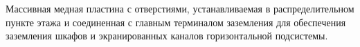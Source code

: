Массивная медная пластина с отверстиями, устанавливаемая в
распределительном пункте этажа и соединенная с главным
терминалом заземления для обеспечения заземления шкафов и
экранированных каналов горизонтальной подсистемы.